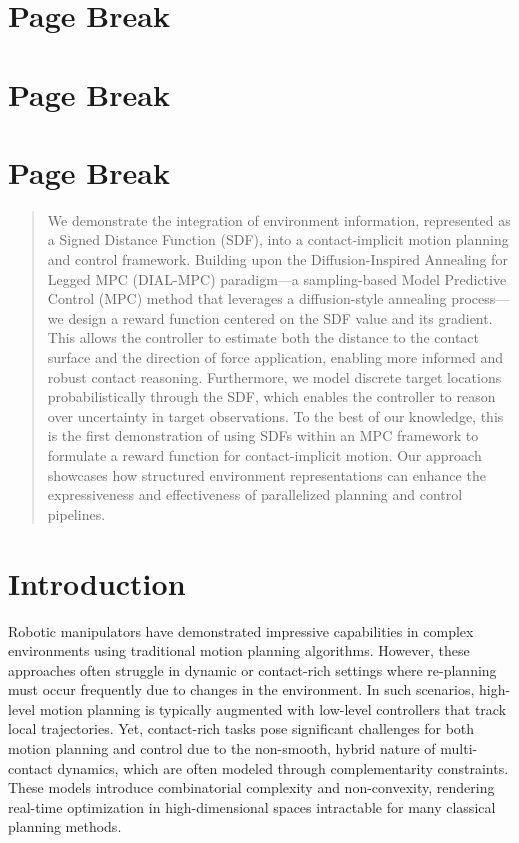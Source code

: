 \documentclass[conference]{IEEEtran}
\begin{document}
\newpage
\section{Page Break}
\newpage
\section{Page Break}
\newpage
\section{Page Break}
\newpage

\begin{abstract}
We demonstrate the integration of environment information, represented as a Signed Distance Function (SDF), into a contact-implicit motion planning and control framework. Building upon the Diffusion-Inspired Annealing for Legged MPC (DIAL-MPC) paradigm—a sampling-based Model Predictive Control (MPC) method that leverages a diffusion-style annealing process—we design a reward function centered on the SDF value and its gradient. This allows the controller to estimate both the distance to the contact surface and the direction of force application, enabling more informed and robust contact reasoning. Furthermore, we model discrete target locations probabilistically through the SDF, which enables the controller to reason over uncertainty in target observations. To the best of our knowledge, this is the first demonstration of using SDFs within an MPC framework to formulate a reward function for contact-implicit motion. Our approach showcases how structured environment representations can enhance the expressiveness and effectiveness of parallelized planning and control pipelines.
\end{abstract}

\section{Introduction}
Robotic manipulators have demonstrated impressive capabilities in complex environments using traditional motion planning algorithms. However, these approaches often struggle in dynamic or contact-rich settings where re-planning must occur frequently due to changes in the environment. In such scenarios, high-level motion planning is typically augmented with low-level controllers that track local trajectories. Yet, contact-rich tasks pose significant challenges for both motion planning and control due to the non-smooth, hybrid nature of multi-contact dynamics, which are often modeled through complementarity constraints. These models introduce combinatorial complexity and non-convexity, rendering real-time optimization in high-dimensional spaces intractable for many classical planning methods.
\end{document}
